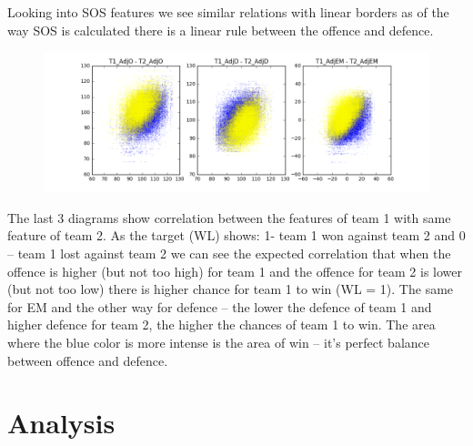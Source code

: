 \documentclass[
10pt, %
a4paper, %
oneside, %
headinclude,footinclude, %
BCOR5mm, %
]{scrartcl}
\begin{document}
Looking into SOS features we see similar relations with linear borders as of the way SOS is calculated there is a linear rule between the offence and defence.
\begin{figure}[H]
  \centering
\includegraphics[width=\textwidth]{Correlation5}
\end{figure}
The last 3 diagrams show correlation between the features of team 1 with same feature of team 2. As the target (WL) shows: 1- team 1 won against team 2 and 0 – team 1 lost against team 2 we can see the expected correlation that when the offence is higher (but not too high) for team 1 and the offence for team 2 is lower (but not too low) there is higher chance for team 1 to win (WL = 1). The same for EM and the other way for defence – the lower the defence of team 1 and higher defence for team 2, the higher the chances of team 1 to win. The area where the blue color is more intense is the area of win – it’s perfect balance between offence and defence.



\section{Analysis}
\end{document}
